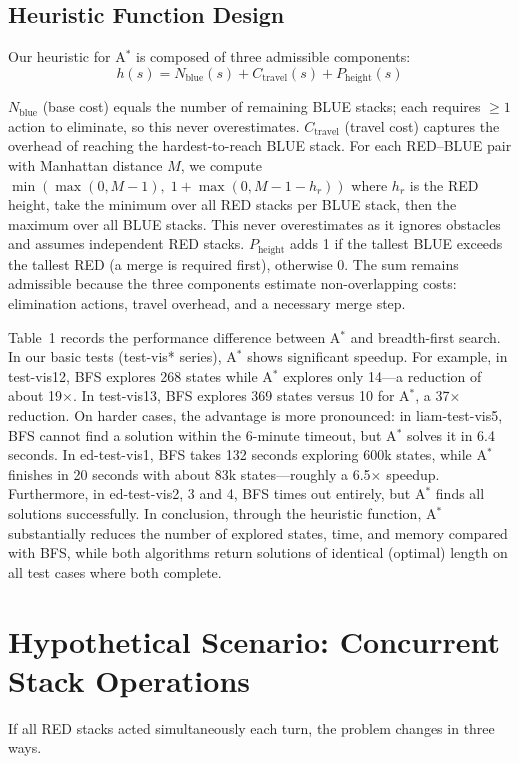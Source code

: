 \documentclass[runningheads]{llncs}
\begin{document}
\subsection{Heuristic Function Design}
Our heuristic for A$^*$ is composed of three admissible components:
\begin{equation}
    \label{eq:heuristic_new}
    h(s) = N_{\text{blue}}(s) + C_{\text{travel}}(s) + P_{\text{height}}(s)
\end{equation}

$N_{\text{blue}}$ (base cost) equals the number of remaining BLUE stacks; each requires $\geq 1$ action to eliminate, so this never overestimates.
$C_{\text{travel}}$ (travel cost) captures the overhead of reaching the hardest-to-reach BLUE stack. For each RED--BLUE pair with Manhattan distance $M$, we compute $\min(\max(0, M{-}1),\; 1 + \max(0, M{-}1{-}h_r))$ where $h_r$ is the RED height, take the minimum over all RED stacks per BLUE stack, then the maximum over all BLUE stacks. This never overestimates as it ignores obstacles and assumes independent RED stacks.
$P_{\text{height}}$ adds 1 if the tallest BLUE exceeds the tallest RED (a merge is required first), otherwise 0.
The sum remains admissible because the three components estimate non-overlapping costs: elimination actions, travel overhead, and a necessary merge step.

Table~1 \cite{comp30024-project1-data} records the performance difference between A$^*$ and breadth-first search. In our basic tests (test-vis* series), A$^*$ shows significant speedup. For example, in test-vis12, BFS explores 268 states while A$^*$ explores only 14---a reduction of about 19$\times$. In test-vis13, BFS explores 369 states versus 10 for A$^*$, a 37$\times$ reduction. On harder cases, the advantage is more pronounced: in liam-test-vis5, BFS cannot find a solution within the 6-minute timeout, but A$^*$ solves it in 6.4 seconds. In ed-test-vis1, BFS takes 132 seconds exploring 600k states, while A$^*$ finishes in 20 seconds with about 83k states---roughly a 6.5$\times$ speedup. Furthermore, in ed-test-vis2, 3 and 4, BFS times out entirely, but A$^*$ finds all solutions successfully. In conclusion, through the heuristic function, A$^*$ substantially reduces the number of explored states, time, and memory compared with BFS, while both algorithms return solutions of identical (optimal) length on all test cases where both complete.



\section{Hypothetical Scenario: Concurrent Stack Operations}
If all RED stacks acted simultaneously each turn, the problem changes in three ways.
\end{document}
